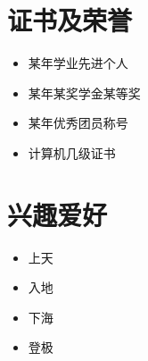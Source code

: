 \documentclass[11pt]{article}
\newcommand{\primarycolor}{\color{CUGblue}}
\newlength{\iconwidth}
\begin{document}
	\begin{minipage}[t]{0.6\textwidth}
		\section[证书及荣誉]{\makebox[\iconwidth][c]{\primarycolor{\faMedal}}\quad 证书及荣誉}
			\begin{itemize}
			\setlength{\itemsep}{0.5em}
				\item 某年学业先进个人
				\item 某年某奖学金某等奖
				\item 某年优秀团员称号
				\item 计算机几级证书
			\end{itemize}
	\end{minipage}
	\hfill
	\begin{minipage}[t]{0.35\textwidth}
		\section[兴趣爱好]{\makebox[\iconwidth][c]{\primarycolor{\faPalette}}\quad 兴趣爱好}
			\begin{itemize}
			\setlength{\itemsep}{0.5em}
				\item 上天
				\item 入地
				\item 下海
				\item 登极
			\end{itemize}

		\vspace{1.2em}
		\end{minipage}
	

\end{document}
